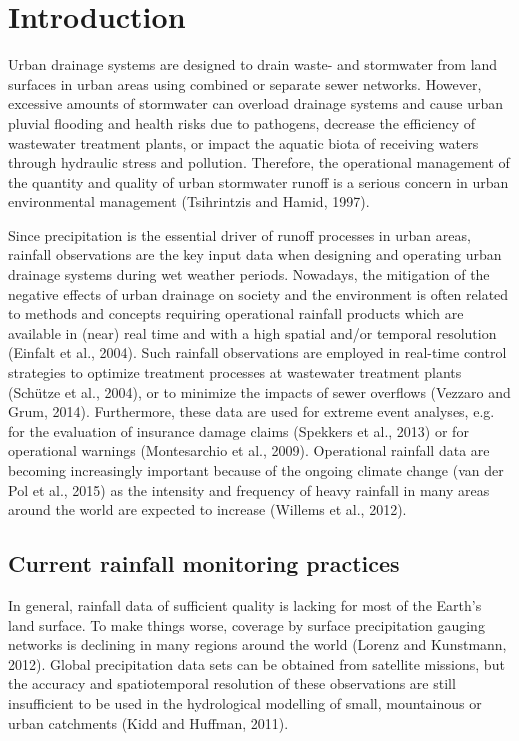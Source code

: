 \documentclass{ctuthesis}\usepackage[]{graphicx}\usepackage[]{color}
\begin{document}
\section{Introduction}

Urban drainage systems are designed to drain waste- and stormwater from land surfaces in urban areas using combined or separate sewer networks. However, excessive amounts of stormwater can overload drainage systems and cause urban pluvial flooding and health risks due to pathogens, decrease the efficiency of wastewater treatment plants, or impact the aquatic biota of receiving waters through hydraulic stress and pollution. Therefore, the operational management of the quantity and quality of urban stormwater runoff is a serious concern in urban environmental management (Tsihrintzis and Hamid, 1997).

Since precipitation is the essential driver of runoff processes in urban areas, rainfall observations are the key input data when designing and operating urban drainage systems during wet weather periods. Nowadays, the mitigation of the negative effects of urban drainage on society and the environment is often related to methods and concepts requiring operational rainfall products which are available in (near) real time and with a high spatial and/or temporal resolution (Einfalt et al., 2004). Such rainfall observations are employed in real-time control strategies to optimize treatment processes at wastewater treatment plants (Schütze et al., 2004), or to minimize the impacts of sewer overflows (Vezzaro and Grum, 2014). Furthermore, these data are used for extreme event analyses, e.g. for the evaluation of insurance damage claims (Spekkers et al., 2013) or for operational warnings (Montesarchio et al., 2009). Operational rainfall data are becoming increasingly important because of the ongoing climate change (van der Pol et al., 2015) as the intensity and frequency of heavy rainfall in many areas around the world are expected to increase (Willems et al., 2012). 

\subsection{Current rainfall monitoring practices}

In general, rainfall data of sufficient quality is lacking for most of the Earth’s land surface. To make things worse, coverage by surface precipitation gauging networks is declining in many regions around the world (Lorenz and Kunstmann, 2012). Global precipitation data sets can be obtained from satellite missions, but the accuracy and spatiotemporal resolution of these observations are still insufficient to be used in the hydrological modelling of small, mountainous or urban catchments (Kidd and Huffman, 2011).
\end{document}
